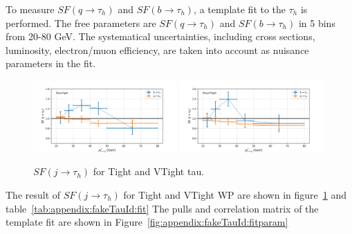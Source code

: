 



To measure $SF (q\to \tau_h)$  and $SF (b\to \tau_h)$, a template fit to the $\tau_h$ \pt is performed.   The free parameters are $SF (q\to \tau_h)$  and $SF (b\to \tau_h)$ in 5 \pt bins from 20-80 GeV.  The systematical uncertainties, including cross sections, luminosity, electron/muon efficiency, are taken into account as nuisance parameters in the fit.






\begin{figure}
    \centering
    \includegraphics[width=0.49\textwidth]{chapters/Analysis/sectionCalibration/figures/jetToTauh/fit2_ptflavor2_lltauTight.png}
    \includegraphics[width=0.49\textwidth]{chapters/Analysis/sectionCalibration/figures/jetToTauh/fit2_ptflavor2_lltauVTight.png}
    \caption{$SF (j\to \tau_h)$ for Tight and VTight tau.}
    \label{fig:appendix:fakeTauId:fit}
\end{figure}



The result of $SF (j\to \tau_h)$ for Tight and VTight WP are shown in figure~\ref{fig:appendix:fakeTauId:fit} and table~\ref{tab:appendix:fakeTauId:fit} The pulls and correlation matrix of the template fit are shown in Figure~\ref{fig:appendix:fakeTauId:fitparam}

